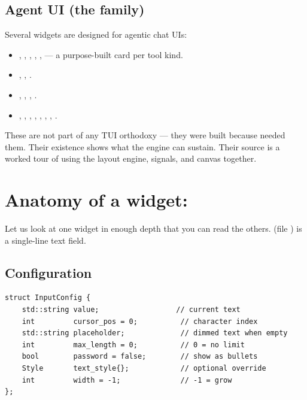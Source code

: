 \subsection{Agent UI (the \agentty{} family)}

Several widgets are designed for agentic chat UIs:

\begin{itemize}[leftmargin=*]
  \item {}, , ,
    , ,  --- a
    purpose-built card per tool kind.
  \item {}, , .
  \item {}, ,
    , .
  \item {}, ,
    , ,
    , , ,
    .
\end{itemize}

These are not part of any TUI orthodoxy --- they were built because
\agentty{} needed them. Their existence shows what the engine can
sustain. Their source is a worked tour of using the layout engine,
signals, and canvas together.

\section{Anatomy of a widget: }

Let us look at one widget in enough depth that you can read the
others.  (file ) is a single-line
text field.

\subsection{Configuration}

\begin{lstlisting}
struct InputConfig {
    std::string value;                  // current text
    int         cursor_pos = 0;          // character index
    std::string placeholder;             // dimmed text when empty
    int         max_length = 0;          // 0 = no limit
    bool        password = false;        // show as bullets
    Style       text_style{};            // optional override
    int         width = -1;              // -1 = grow
};
\end{lstlisting}

